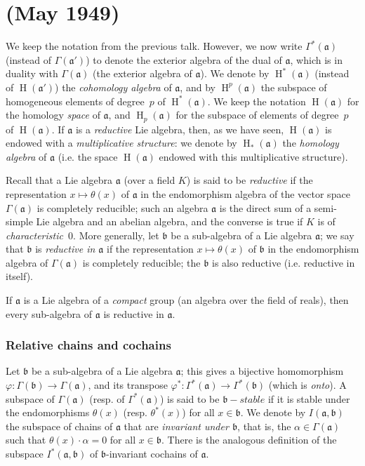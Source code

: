 \documentclass{article}
\newcommand{\fk}{\mathfrak}
\DeclareMathOperator{\HH}{H}
\begin{document}
\part{(May 1949)}
\label{III}

We keep the notation from the previous talk.
However, we now write $\Gamma^*(\fk{a})$ (instead of $\Gamma(\fk{a}')$) to denote the exterior algebra of the dual of $\fk{a}$, which is in duality with $\Gamma(\fk{a})$ (the exterior algebra of $\fk{a}$).
We denote by $\HH^*(\fk{a})$ (instead of $\HH(\fk{a}')$) the \emph{cohomology algebra} of $\fk{a}$, and by $\HH^p(\fk{a})$ the subspace of homogeneous elements of degree~$p$ of $\HH^*(\fk{a})$.
We keep the notation $\HH(\fk{a})$ for the homology \emph{space} of $\fk{a}$, and $\HH_p(\fk{a})$ for the subspace of elements of degree~$p$ of $\HH(\fk{a})$.
If $\fk{a}$ is a \emph{reductive} Lie algebra, then, as we have seen, $\HH(\fk{a})$ is endowed with a \emph{multiplicative structure}:
we denote by $\HH_*(\fk{a})$ the \emph{homology algebra} of $\fk{a}$ (i.e. the space $\HH(\fk{a})$ endowed with this multiplicative structure).

Recall that a Lie algebra $\fk{a}$ (over a field $K$) is said to be \emph{reductive} if the representation $x\mapsto\theta(x)$ of $\fk{a}$ in the endomorphism algebra of the vector space $\Gamma(\fk{a})$ is completely reducible;
such an algebra $\fk{a}$ is the direct sum of a semi-simple Lie algebra and an abelian algebra, and the converse is true if $K$ is of \emph{characteristic~$0$}.
More generally, let $\fk{b}$ be a sub-algebra of a Lie algebra $\fk{a}$;
we say that $\fk{b}$ is \emph{reductive in $\fk{a}$} if the representation $x\mapsto\theta(x)$ of $\fk{b}$ in the endomorphism algebra of $\Gamma(\fk{a})$ is completely reducible;
the $\fk{b}$ is also reductive (i.e. reductive in itself).

If $\fk{a}$ is a Lie algebra of a \emph{compact} group (an algebra over the field of reals), then every sub-algebra of $\fk{a}$ is reductive in $\fk{a}$.


\section{Relative chains and cochains}
\label{III.1}

Let $\fk{b}$ be a sub-algebra of a Lie algebra $\fk{a}$;
this gives a bijective homomorphism $\varphi\colon\Gamma(\fk{b})\to\Gamma(\fk{a})$, and its transpose $\varphi^*\colon\Gamma^*(\fk{a})\to\Gamma^*(\fk{b})$ (which is \emph{onto}).
A subspace of $\Gamma(\fk{a})$ (resp. of $\Gamma^*(\fk{a})$) is said to be \emph{$\fk{b}-stable$} if it is stable under the endomorphisms $\theta(x)$ (resp. $\theta^*(x)$) for all $x\in\fk{b}$.
We denote by $I(\fk{a},\fk{b})$ the subspace of chains of $\fk{a}$ that are \emph{invariant under $\fk{b}$}, that is, the $\alpha\in\Gamma(\fk{a})$ such that $\theta(x)\cdot\alpha=0$ for all $x\in\fk{b}$.
There is the analogous definition of the subspace $I^*(\fk{a},\fk{b})$ of $\fk{b}$-invariant cochains of $\fk{a}$.
\end{document}
